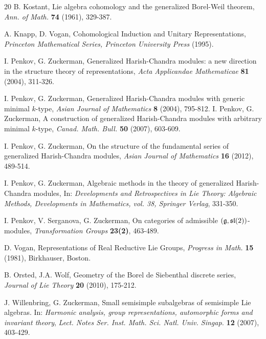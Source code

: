 \documentclass[12pt]{amsart}
\def\mathfrak{\frak}
\theoremstyle{plain} %
\numberwithin{equation}{section}
\theoremstyle{definition}
\theoremstyle{remark}
\theoremstyle{plain} %
\newcommand{\fg}{\mathfrak{g}}
\begin{document}
\begin{thebibliography}{20}
 B. Kostant, Lie algebra cohomology and the generalized Borel-Weil theorem, {\it Ann. of Math.}
{\bf 74} (1961), 329-387.

  A. Knapp, D. Vogan, Cohomological Induction and Unitary Representations, {\it Princeton Mathematical Series, Princeton
University Press} (1995).

  I. Penkov, G. Zuckerman, Generalized Harish-Chandra modules: a new direction in the structure theory of representations, {\it Acta Applicandae Mathematicae} {\bf 81} (2004), 311-326.

 I. Penkov, G. Zuckerman, Generalized Harish-Chandra modules with generic minimal $k$-type, {\it Asian Journal of Mathematics} {\bf 8} (2004), 795-812.
 I. Penkov, G. Zuckerman, A construction of generalized Harish-Chandra modules with arbitrary minimal $k$-type, {\it Canad. Math. Bull.} {\bf 50} (2007), 603-609.

 I. Penkov, G. Zuckerman, On the structure of the fundamental series of generalized Harish-Chandra modules, {\it Asian Journal of Mathematics} {\bf 16} (2012), 489-514.

 I. Penkov, G. Zuckerman, Algebraic methods in the theory of generalized Harish-Chandra modules, In: {\it  Developments and Retrospectives in Lie Theory: Algebraic Methods,  Developments in Mathematics, vol. 38, Springer Verlag}, 331-350.

 I. Penkov, V. Serganova, G. Zuckerman, On categories of admissible $(\fg,\mathfrak{sl}(2))$-modules, {\it Transformation Groups} {\bf 23(2)}, 463-489.

 D. Vogan, Representations of Real Reductive Lie Groups, {\it Progress in Math.} {\bf 15} (1981), Birkhauser, Boston.

  B. Orsted, J.A. Wolf, Geometry of the Borel de Siebenthal discrete series, {\it  Journal of
Lie Theory} {\bf20} (2010), 175-212.

 J. Willenbring, G. Zuckerman, Small semisimple subalgebras of semisimple Lie algebras. In: {\it Harmonic analysis, group representations, automorphic forms and invariant theory}, {\it Lect. Notes Ser. Inst. Math. Sci. Natl. Univ. Singap.} {\bf 12} (2007), 403-429.



\end{thebibliography}
\end{document}
